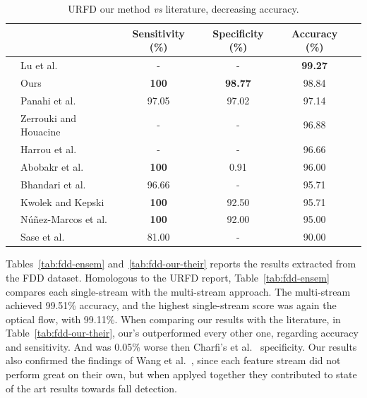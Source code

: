 \documentclass[conference]{IEEEtran}
\begin{document}
{\begin{table}[t]
\centering
\caption{URFD our method \textit{vs} literature, decreasing accuracy.}
\label{tab:urfd-our-their}
\begin{tabular}{llcccl}
\hline
 &                                                      & Sensitivity (\%)  & Specificity (\%)  & Accuracy (\%)     & \\ \hline
 & Lu et al.~\cite{lu2018deep}                          & -                 & -                 & \textbf{99.27}    & \\
 & Ours                                                 & \textbf{100}      & \textbf{98.77}    & 98.84             & \\
 & Panahi et al.~\cite{panahi2018human}                 & 97.05             & 97.02             & 97.14             & \\
 & Zerrouki and Houacine~\cite{zerrouki2018combined}    & -                 & -                 & 96.88             & \\
 & Harrou et al.~\cite{harrou2017vision}                & -                 & -                 & 96.66             & \\
 & Abobakr et al.~\cite{abobakr2017skeleton}            & \textbf{100}      & 0.91              & 96.00             & \\
 & Bhandari et al.~\cite{bhandari2017novel}             & 96.66             & -                 & 95.71             & \\
 & Kwolek and Kepski~\cite{kwolek2015improving}         & \textbf{100}      & 92.50             & 95.71             & \\
 & N\'u\~nez-Marcos et al.~\cite{nunez2017vision}       & \textbf{100}      & 92.00             & 95.00             & \\
 & Sase et al.~\cite{sase2018human}                     & 81.00             & -                 & 90.00             & \\ \hline
\end{tabular}
\end{table}

Tables~\ref{tab:fdd-ensem} and~\ref{tab:fdd-our-their} reports the results extracted from the FDD dataset. Homologous to the URFD report, Table~\ref{tab:fdd-ensem} compares each single-stream with the multi-stream approach. The multi-stream achieved 99.51\% accuracy, and the highest single-stream score was again the optical flow, with 99.11\%. When comparing our results with the literature, in Table~\ref{tab:fdd-our-their}, our's outperformed every other one, regarding accuracy and sensitivity. And was 0.05\% worse then Charfi's et al.~\cite{charfi2013optimised} specificity. Our results also confirmed the findings of Wang et al.~\cite{wang2015towards}, since each feature stream did not perform great on their own, but when applyed together they contributed to state of the art results towards fall detection.

}
\end{document}
